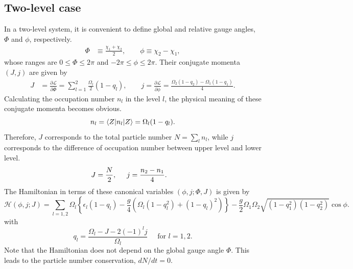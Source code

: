 \documentclass[%
superscriptaddress,
preprint,
showpacs,
nofootinbib,
amsmath,amssymb,
aps,
prc,
floatfix ]%
{revtex4-1}
\begin{document}
\subsection{Two-level case}

In a two-level system,
it is convenient to define global and relative gauge angles,
$\Phi$ and $\phi$, respectively.
\begin{align}
  \Phi &\equiv \frac{\chi_1 + \chi_2}{2}, \quad\quad
\phi\equiv \chi_2 - \chi_1,
\label{phi}
\end{align}
whose ranges are $0\leq \Phi \leq 2\pi$ and $-2\pi \leq \phi \leq 2\pi$.
Their conjugate momenta $(J,j)$ are given by
\begin{align}
	J &= \frac{\partial\mathcal{L}}{\partial\dot{\Phi}} =  \sum_{l=1}^2 \frac{\Omega_l}{2}(1-q_l), 
\quad\quad
j = \frac{\partial\mathcal{L}}{\partial\dot{\phi}} = \frac{\Omega_2(1-q_2) - \Omega_1(1-q_1)}{4}.
	\label{pi}
\end{align}
Calculating the occupation number $n_l$ in the level $l$,
the physical meaning of these conjugate momenta becomes obvious.
\begin{equation}
   n_l = \braket{Z|n_l|Z} %
	= \Omega_l(1-q_l) .
\end{equation}
Therefore, $J$ corresponds to the total particle number
$N=\sum_l n_l$,
while $j$ corresponds to the difference of occupation number
between upper level and lower level. 
\begin{align}
  J &= \frac{N}{2}, \hspace{5mm} j = \frac{n_{2}-n_{1}}{4} .
  \label{momentum}
\end{align}
The Hamiltonian in terms of these canonical variables
$(\phi,j;\Phi,J)$ is given by
\begin{equation}
\mathcal{H}(\phi,j;J)
	= \sum_{l=1,2} \Omega_l \left\{ \epsilon_l(1- q_l)
	- \frac{g}{4} (\Omega_l(1-q_l^2)+(1-q_l)^2) \right\}
- \frac{g}{2}\Omega_1\Omega_2
	\sqrt{(1-q_1^2)(1-q_2^2)} \cos\phi .
\label{TDHFB_Hamiltonian_3}
\end{equation}
with
\begin{equation}
	q_l=\frac{\Omega_l - J -2(-1)^l j}{\Omega_l} 
	\quad \mbox{ for } l=1,2.
	\label{q_l}
\end{equation}
Note that the Hamiltonian does not depend on the global gauge angle $\Phi$.
This leads to the particle number conservation, $dN/dt=0$.
\end{document}
